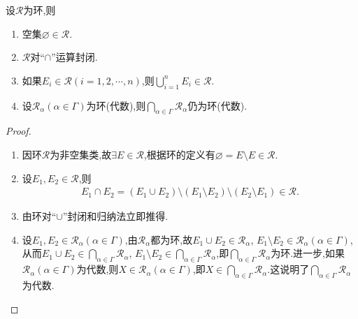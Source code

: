 \documentclass[../../main.tex]{subfiles}%
\begin{document}
\begin{theorem}\label{theorem:集合论定理1.3..948h3}
设$\mathscr{R}$为环,则
\begin{enumerate}[(1)]
\item\label{theorem:集合论定理1.3..948h3-1} 空集$\varnothing \in \mathscr{R}$.
\item\label{theorem:集合论定理1.3..948h3-2} $\mathscr{R}$对“$\cap$”运算封闭.
\item\label{theorem:集合论定理1.3..948h3-3} 如果$E_i \in \mathscr{R}(i=1,2,\cdots,n)$,则$\bigcup_{i=1}^{n} E_i \in \mathscr{R}$.
\item\label{theorem:集合论定理1.3..948h3-4} 设$\mathscr{R}_\alpha(\alpha \in \Gamma)$为环(代数),则$\bigcap_{\alpha \in \Gamma} \mathscr{R}_\alpha$仍为环(代数).
\end{enumerate}
\end{theorem}
\begin{proof}
\begin{enumerate}[(1)]
\item 因环$\mathscr{R}$为非空集类,故$\exists E \in \mathscr{R}$,根据环的定义有$\varnothing = E \setminus E \in \mathscr{R}$.

\item 设$E_1,E_2 \in \mathscr{R}$,则
\begin{align*}
E_1 \cap E_2 = (E_1 \cup E_2) \setminus (E_1 \setminus E_2) \setminus (E_2 \setminus E_1) \in \mathscr{R}.
\end{align*}

\item 由环对“$\cup$”封闭和归纳法立即推得.

\item 设$E_1,E_2 \in \mathscr{R}_\alpha(\alpha \in \Gamma)$,由$\mathscr{R}_\alpha$都为环,故$E_1 \cup E_2 \in \mathscr{R}_\alpha$, $E_1 \setminus E_2 \in \mathscr{R}_\alpha(\alpha \in \Gamma)$,从而$E_1 \cup E_2 \in \bigcap_{\alpha \in \Gamma} \mathscr{R}_\alpha$, $E_1 \setminus E_2 \in \bigcap_{\alpha \in \Gamma} \mathscr{R}_\alpha$,即$\bigcap_{\alpha \in \Gamma} \mathscr{R}_\alpha$为环.进一步,如果$\mathscr{R}_\alpha(\alpha \in \Gamma)$为代数,则$X \in \mathscr{R}_\alpha(\alpha \in \Gamma)$,即$X \in \bigcap_{\alpha \in \Gamma} \mathscr{R}_\alpha$.这说明了$\bigcap_{\alpha \in \Gamma} \mathscr{R}_\alpha$为代数.
\end{enumerate}

\end{proof}
\end{document}
